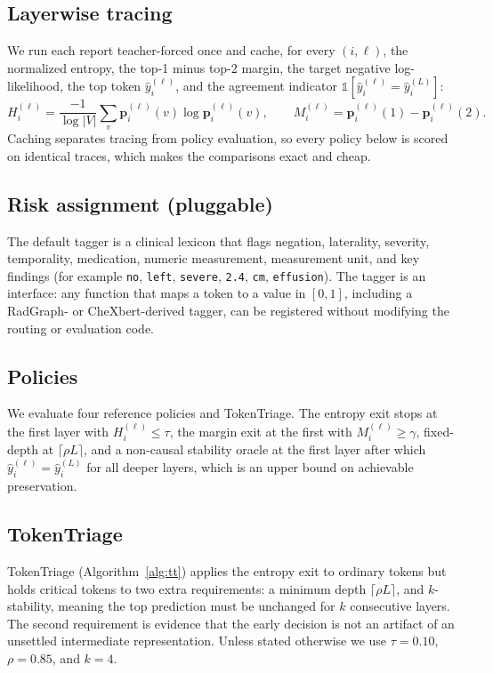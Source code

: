 \documentclass[11pt]{article}
\newcommand{\method}{\mbox{TokenTriage}}
\begin{document}
\subsection{Layerwise tracing}
We run each report teacher-forced once and cache, for every $(i,\ell)$, the normalized entropy, the
top-1 minus top-2 margin, the target negative log-likelihood, the top token $\hat y_i^{(\ell)}$, and the
agreement indicator $\mathbb{1}[\hat y_i^{(\ell)}=\hat y_i^{(L)}]$:
\begin{equation}
H_i^{(\ell)} = \frac{-1}{\log |V|}\sum_v \bm{p}_i^{(\ell)}(v)\log \bm{p}_i^{(\ell)}(v),
\qquad
M_i^{(\ell)} = \bm{p}_i^{(\ell)}{\scriptstyle(1)} - \bm{p}_i^{(\ell)}{\scriptstyle(2)} .
\end{equation}
Caching separates tracing from policy evaluation, so every policy below is scored on identical traces,
which makes the comparisons exact and cheap.

\subsection{Risk assignment (pluggable)}
\label{sec:risk}
The default tagger is a clinical lexicon that flags negation, laterality, severity, temporality,
medication, numeric measurement, measurement unit, and key findings (for example \texttt{no},
\texttt{left}, \texttt{severe}, \texttt{2.4}, \texttt{cm}, \texttt{effusion}). The tagger is an
interface: any function that maps a token to a value in $[0,1]$, including a RadGraph- or
CheXbert-derived tagger, can be registered without modifying the routing or evaluation code.

\subsection{Policies}
We evaluate four reference policies and \method{}. The entropy exit stops at the first layer with
$H_i^{(\ell)}\le\tau$, the margin exit at the first with $M_i^{(\ell)}\ge\gamma$, fixed-depth at
$\lceil\rho L\rceil$, and a non-causal stability oracle at the first layer after which
$\hat y_i^{(\ell)}=\hat y_i^{(L)}$ for all deeper layers, which is an upper bound on achievable
preservation.

\subsection{TokenTriage}
\method{} (Algorithm~\ref{alg:tt}) applies the entropy exit to ordinary tokens but holds critical
tokens to two extra requirements: a minimum depth $\lceil\rho L\rceil$, and $k$-stability, meaning the
top prediction must be unchanged for $k$ consecutive layers. The second requirement is evidence that
the early decision is not an artifact of an unsettled intermediate representation. Unless stated
otherwise we use $\tau=0.10$, $\rho=0.85$, and $k=4$.
\end{document}
